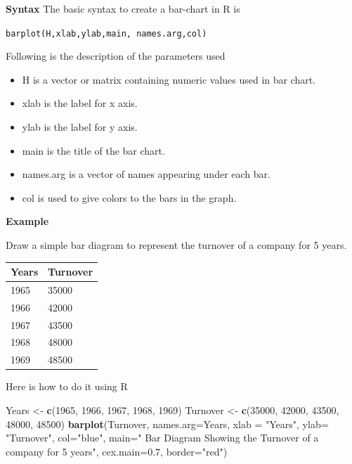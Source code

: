 \documentclass[]{article}
\newenvironment{Shaded}{\begin{snugshade}}{\end{snugshade}}
\newcommand{\DataTypeTok}[1]{\textcolor[rgb]{0.13,0.29,0.53}{#1}}
\newcommand{\DecValTok}[1]{\textcolor[rgb]{0.00,0.00,0.81}{#1}}
\newcommand{\FloatTok}[1]{\textcolor[rgb]{0.00,0.00,0.81}{#1}}
\newcommand{\KeywordTok}[1]{\textcolor[rgb]{0.13,0.29,0.53}{\textbf{#1}}}
\newcommand{\NormalTok}[1]{#1}
\newcommand{\StringTok}[1]{\textcolor[rgb]{0.31,0.60,0.02}{#1}}
\providecommand{\tightlist}{%
  \setlength{\itemsep}{0pt}\setlength{\parskip}{0pt}}
\begin{document}
\textbf{Syntax} The basic syntax to create a bar-chart in R is

\texttt{barplot(H,xlab,ylab,main,\ names.arg,col)}

Following is the description of the parameters used

\begin{itemize}
\tightlist
\item
  H is a vector or matrix containing numeric values used in bar chart.
\item
  xlab is the label for x axis.
\item
  ylab is the label for y axis.
\item
  main is the title of the bar chart.
\item
  names.arg is a vector of names appearing under each bar.
\item
  col is used to give colors to the bars in the graph.
\end{itemize}

\textbf{Example}

Draw a simple bar diagram to represent the turnover of a company for 5
years.

\begin{longtable}[]{@{}ll@{}}
\toprule
Years & Turnover\tabularnewline
\midrule
\endhead
1965 & 35000\tabularnewline
1966 & 42000\tabularnewline
1967 & 43500\tabularnewline
1968 & 48000\tabularnewline
1969 & 48500\tabularnewline
\bottomrule
\end{longtable}

Here is how to do it using R

\begin{Shaded}
\begin{Highlighting}[]
\NormalTok{Years \textless{}{-}}\StringTok{ }\KeywordTok{c}\NormalTok{(}\DecValTok{1965}\NormalTok{, }\DecValTok{1966}\NormalTok{, }\DecValTok{1967}\NormalTok{, }\DecValTok{1968}\NormalTok{, }\DecValTok{1969}\NormalTok{)}
\NormalTok{Turnover \textless{}{-}}\StringTok{ }\KeywordTok{c}\NormalTok{(}\DecValTok{35000}\NormalTok{, }\DecValTok{42000}\NormalTok{, }\DecValTok{43500}\NormalTok{, }\DecValTok{48000}\NormalTok{, }\DecValTok{48500}\NormalTok{)}
\KeywordTok{barplot}\NormalTok{(Turnover, }\DataTypeTok{names.arg=}\NormalTok{Years, }\DataTypeTok{xlab =} \StringTok{"Years"}\NormalTok{, }\DataTypeTok{ylab=} \StringTok{"Turnover"}\NormalTok{,}
                \DataTypeTok{col=}\StringTok{"blue"}\NormalTok{,  }
                \DataTypeTok{main=}\StringTok{" Bar Diagram Showing the Turnover of a company for 5 years"}\NormalTok{,  }
                \DataTypeTok{cex.main=}\FloatTok{0.7}\NormalTok{,}
                \DataTypeTok{border=}\StringTok{"red"}\NormalTok{)}
\end{Highlighting}
\end{Shaded}
\end{document}
